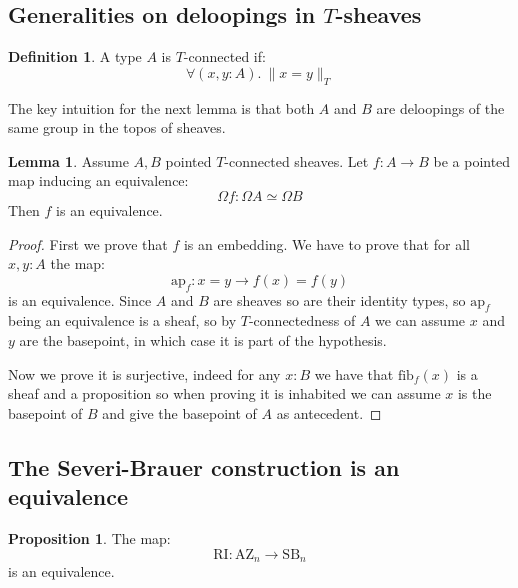 \documentclass[10pt,a4paper]{article}
\theoremstyle{definition}
\newtheorem{lemma}[theorem]{Lemma}
\newtheorem{definition}[theorem]{Definition}
\newtheorem{proposition}[theorem]{Proposition}
\newcommand{\SB}{\mathrm{SB}}
\newcommand{\RI}{\mathrm{RI}}
\newcommand{\AZ}{\mathrm{AZ}}
\newcommand{\propTrunc}[1]{\lVert #1 \rVert}
\newcommand{\fib}{\mathrm{fib}}
\begin{document}
\subsection{Generalities on deloopings in $T$-sheaves}

\begin{definition}
A type $A$ is $T$-connected if:
\[\forall(x,y:A).\ \propTrunc{x=y}_T\]
\end{definition}

The key intuition for the next lemma is that both $A$ and $B$ are deloopings of the same group in the topos of sheaves.

\begin{lemma}\label{deloopings-equivalence}
Assume $A,B$ pointed $T$-connected sheaves. Let $f:A\to B$ be a pointed map inducing an equivalence:
\[\Omega f : \Omega A \simeq \Omega B\]
Then $f$ is an equivalence.
\end{lemma}

\begin{proof}
First we prove that $f$ is an embedding. We have to prove that for all $x,y:A$ the map:
\[\mathrm{ap}_f : x=y \to f(x)=f(y)\]
is an equivalence. Since $A$ and $B$ are sheaves so are their identity types, so $\mathrm{ap}_f$ being an equivalence is a sheaf, so by $T$-connectedness of $A$ we can assume $x$ and $y$ are the basepoint, in which case it is part of the hypothesis.

Now we prove it is surjective, indeed for any $x:B$ we have that $\fib_f(x)$ is a sheaf and a proposition so when proving it is inhabited we can assume $x$ is the basepoint of $B$ and give the basepoint of $A$ as antecedent.
\end{proof}



\subsection{The Severi-Brauer construction is an equivalence}

\begin{proposition}\label{right-ideal-is-equivalence}
The map:
\[\RI:\AZ_n\to\SB_n\]
is an equivalence.
\end{proposition}
\end{document}
